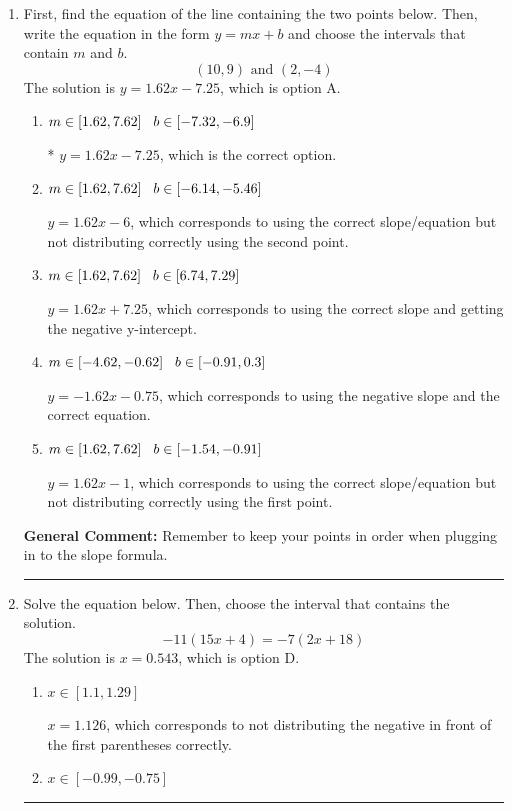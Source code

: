 \documentclass{extbook}[14pt]
\newcommand{\litem}[1]{\item #1

\rule{\textwidth}{0.4pt}}
\begin{document}
\begin{enumerate}\litem{
First, find the equation of the line containing the two points below. Then, write the equation in the form $ y=mx+b $ and choose the intervals that contain $m$ and $b$.
\[ (10, 9) \text{ and } (2, -4) \]The solution is \( y = 1.62x -7.25 \), which is option A.\begin{enumerate}[label=\Alph*.]
\item \( m \in [1.62, 7.62] \hspace*{3mm} b \in [-7.32, -6.9] \)

* $y = 1.62x -7.25$, which is the correct option.
\item \( m \in [1.62, 7.62] \hspace*{3mm} b \in [-6.14, -5.46] \)

 $y = 1.62x -6$, which corresponds to using the correct slope/equation but not distributing correctly using the second point.
\item \( m \in [1.62, 7.62] \hspace*{3mm} b \in [6.74, 7.29] \)

 $y = 1.62x + 7.25$, which corresponds to using the correct slope and getting the negative y-intercept.
\item \( m \in [-4.62, -0.62] \hspace*{3mm} b \in [-0.91, 0.3] \)

 $y = -1.62x -0.75$, which corresponds to using the negative slope and the correct equation.
\item \( m \in [1.62, 7.62] \hspace*{3mm} b \in [-1.54, -0.91] \)

 $y = 1.62x -1$, which corresponds to using the correct slope/equation but not distributing correctly using the first point.
\end{enumerate}

\textbf{General Comment:} Remember to keep your points in order when plugging in to the slope formula.
}
\litem{
Solve the equation below. Then, choose the interval that contains the solution.
\[ -11(15x + 4) = -7(2x + 18) \]The solution is \( x = 0.543 \), which is option D.\begin{enumerate}[label=\Alph*.]
\item \( x \in [1.1, 1.29] \)

$x = 1.126$, which corresponds to not distributing the negative in front of the first parentheses correctly.
\item \( x \in [-0.99, -0.75] \)


\end{enumerate}}
\end{enumerate}
\end{document}
